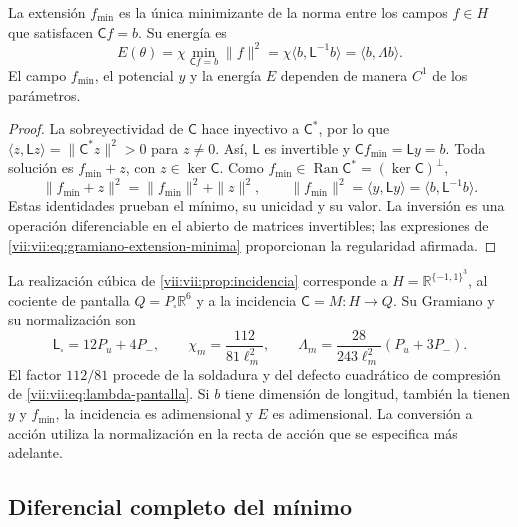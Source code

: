 \begin{proposition}
\label{vii:vii:prop:minimo-parametrizado}
La extensión \(f_{\min}\) es la única minimizante de la norma entre
los campos \(f\in H\) que satisfacen \(\mathsf C f=b\). Su energía es
\begin{equation}
 E(\theta)=\chi\min_{\mathsf C f=b}\|f\|^2
 =\chi\langle b,\mathsf L^{-1}b\rangle
 =\langle b,\Lambda b\rangle.
 \label{vii:vii:eq:energia-extension-minima}
\end{equation}
El campo \(f_{\min}\), el potencial \(y\) y la energía \(E\)
dependen de manera \(C^1\) de los parámetros.
\end{proposition}

\begin{proof}
La sobreyectividad de \(\mathsf C\) hace inyectivo a \(\mathsf C^*\),
por lo que \(\langle z,\mathsf Lz\rangle=\|\mathsf C^*z\|^2>0\)
para \(z\ne0\). Así, \(\mathsf L\) es invertible y
\(\mathsf C f_{\min}=\mathsf L y=b\). Toda solución es
\(f_{\min}+z\), con \(z\in\ker\mathsf C\). Como
\(f_{\min}\in\operatorname{Ran}\mathsf C^*=(\ker\mathsf C)^\perp\),
\[
 \|f_{\min}+z\|^2=\|f_{\min}\|^2+\|z\|^2,
 \qquad
 \|f_{\min}\|^2=\langle y,\mathsf L y\rangle
 =\langle b,\mathsf L^{-1}b\rangle.
\]
Estas identidades prueban el mínimo, su unicidad y su valor. La inversión
es una operación diferenciable en el abierto de matrices invertibles;
las expresiones de \eqref{vii:vii:eq:gramiano-extension-minima} proporcionan
la regularidad afirmada.
\end{proof}

La realización cúbica de \ref{vii:vii:prop:incidencia} corresponde a
\(H=\mathbb R^{\{-1,1\}^3}\), al cociente de pantalla
\(Q=P_\square\mathbb R^6\) y a la incidencia \(\mathsf C=M:H\to Q\).
Su Gramiano y su normalización son
\begin{equation}
 \mathsf L_\square=12P_u+4P_-,\qquad
 \chi_m=\frac{112}{81\ell_m^2},\qquad
 \Lambda_m=\frac{28}{243\ell_m^2}(P_u+3P_-).
 \label{vii:vii:eq:normalizacion-minimo-cubico}
\end{equation}
El factor \(112/81\) procede de la soldadura y del defecto cuadrático
de compresión de \eqref{vii:vii:eq:lambda-pantalla}. Si \(b\) tiene dimensión
de longitud, también la tienen \(y\) y \(f_{\min}\), la incidencia es
adimensional y \(E\) es adimensional. La conversión a acción utiliza
la normalización en la recta de acción que se especifica más adelante.

\subsection{Diferencial completo del mínimo}
\label{vii:vii:subsec:diferencial-minimo}

